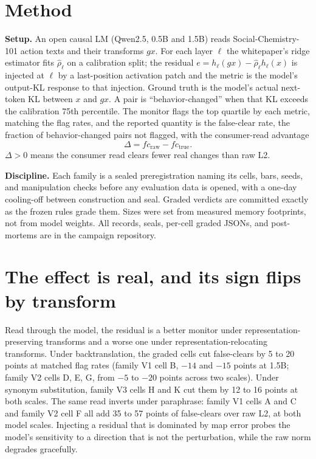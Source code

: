 \documentclass[11pt]{article}
\begin{document}
\section{Method}

\textbf{Setup.} An open causal LM (Qwen2.5, 0.5B and 1.5B) reads
Social-Chemistry-101 action texts and their transforms $g x$. For each layer
$\ell$ the whitepaper's ridge estimator fits $\hat\rho_\ell$ on a calibration
split; the residual $e = h_\ell(g x) - \hat\rho_\ell h_\ell(x)$ is injected at
$\ell$ by a last-position activation patch and the metric is the model's
output-KL response to that injection. Ground truth is the model's actual
next-token KL between $x$ and $g x$. A pair is ``behavior-changed'' when that KL
exceeds the calibration 75th percentile. The monitor flags the top quartile by
each metric, matching the flag rates, and the reported quantity is the
false-clear rate, the fraction of behavior-changed pairs not flagged, with the
consumer-read advantage
\[
  \Delta = fc_{\mathrm{raw}} - fc_{\mathrm{true}}.
\]
$\Delta > 0$ means the consumer read clears fewer real changes than raw L2.

\textbf{Discipline.} Each family is a sealed preregistration naming its cells,
bars, seeds, and manipulation checks before any evaluation data is opened, with
a one-day cooling-off between construction and seal. Graded verdicts are
committed exactly as the frozen rules grade them. Sizes were set from measured
memory footprints, not from model weights. All records, seals, per-cell graded
JSONs, and post-mortems are in the campaign repository.

\section{The effect is real, and its sign flips by transform}

Read through the model, the residual is a better monitor under
representation-preserving transforms and a worse one under
representation-relocating transforms. Under backtranslation, the graded cells
cut false-clears by 5 to 20 points at matched flag rates (family V1 cell B,
$-14$ and $-15$ points at 1.5B; family V2 cells D, E, G, from $-5$ to $-20$
points across two scales). Under synonym substitution, family V3 cells H and K
cut them by 12 to 16 points at both scales. The same read inverts under
paraphrase: family V1 cells A and C and family V2 cell F all add 35 to 57 points
of false-clears over raw L2, at both model scales. Injecting a residual that is
dominated by map error probes the model's sensitivity to a direction that is not
the perturbation, while the raw norm degrades gracefully.
\end{document}
